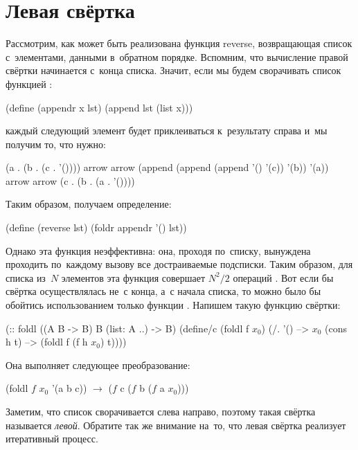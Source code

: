 \section[2]{Левая свёртка}%
Рассмотрим, как может быть реализована функция \si{reverse}, возвращающая список с~элементами, данными в~обратном порядке. Вспомним, что вычисление правой свёртки начинается с~конца списка. Значит, если мы будем сворачивать список функцией :
\begin{SchemeCode}[emph={x,lst}]
(define (appendr x lst)
  (append lst (list x)))
\end{SchemeCode}

 каждый следующий элемент будет приклеиваться к~результату справа и~мы получим то, что нужно:

\begin{SchemeCode}
(a . (b . (c . '()))) arrow
arrow (append (append (append '() '(c)) '(b)) '(a)) arrow
arrow (c . (b . (a . '())))
\end{SchemeCode}

Таким образом, получаем определение:

\begin{Definition}
(define (reverse lst)
  (foldr appendr '() lst))
\end{Definition}

Однако эта функция неэффективна: она, проходя по~списку, вынуждена проходить по~каждому вызову  все достраиваемые подсписки. Таким образом, для списка из~$N$ элементов эта функция совершает $N^2/2$ операций . Вот если бы свёртка осуществлялась не~с конца, а~с начала списка, то можно было бы обойтись использованием только функции . Напишем такую функцию свёртки:

\begin{Definition}[emph={f,h,t}]
(:: foldl ((A B -> B) B (list: A ..) -> B)
 (define/c (foldl f $x_0$)
   (/. '() --> $x_0$
       (cons h t) --> (foldl f (f h $x_0$) t))))
\end{Definition}

\noindent
Она выполняет следующее преобразование:

\begin{SchemeCode}
      (foldl $f$ $x_0$ '(a b c))  $\rightarrow$  ($f$ c ($f$ b ($f$ a $x_0$)))
\end{SchemeCode}

\noindent Заметим, что список сворачивается слева направо, поэтому такая свёртка называется \emph{левой}. Обратите так же внимание на~то, что левая свёртка реализует итеративный процесс.

